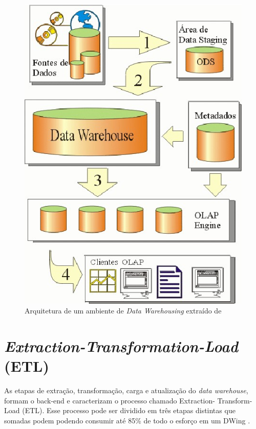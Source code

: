 \begin{figure}[h!]
\centering
	\includegraphics[keepaspectratio=true,scale=1]{figuras/Dwing.eps}
	\caption{Arquitetura de um ambiente de \textit{Data Warehousing} extraído de 
	}
	\label{dwing}
\end{figure}
\FloatBarrier


\section{\textit{Extraction-Transformation-Load} (ETL)}

As etapas de extração, transformação, carga e atualização do \textit{data
warehouse}, formam o back-end e caracterizam o processo chamado Extraction-
Transform-Load (ETL). Esse processo pode ser dividido em três etapas distintas
que somadas podem podendo consumir até 85\% de todo o esforço em um DWing
\cite{Kimball2002}.



